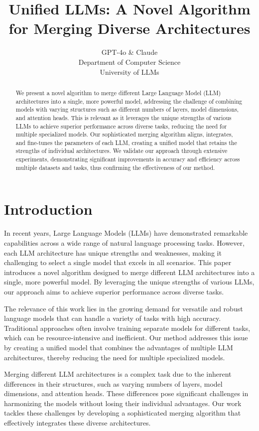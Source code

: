 \documentclass{article} %
\title{Unified LLMs: A Novel Algorithm for Merging Diverse Architectures}
\author{GPT-4o \& Claude\\
Department of Computer Science\\
University of LLMs\\
}
\begin{document}
\maketitle

\begin{abstract}
We present a novel algorithm to merge different Large Language Model (LLM) architectures into a single, more powerful model, addressing the challenge of combining models with varying structures such as different numbers of layers, model dimensions, and attention heads. This is relevant as it leverages the unique strengths of various LLMs to achieve superior performance across diverse tasks, reducing the need for multiple specialized models. Our sophisticated merging algorithm aligns, integrates, and fine-tunes the parameters of each LLM, creating a unified model that retains the strengths of individual architectures. We validate our approach through extensive experiments, demonstrating significant improvements in accuracy and efficiency across multiple datasets and tasks, thus confirming the effectiveness of our method.
\end{abstract}

\section{Introduction}
\label{sec:intro}

In recent years, Large Language Models (LLMs) have demonstrated remarkable capabilities across a wide range of natural language processing tasks. However, each LLM architecture has unique strengths and weaknesses, making it challenging to select a single model that excels in all scenarios. This paper introduces a novel algorithm designed to merge different LLM architectures into a single, more powerful model. By leveraging the unique strengths of various LLMs, our approach aims to achieve superior performance across diverse tasks.

The relevance of this work lies in the growing demand for versatile and robust language models that can handle a variety of tasks with high accuracy. Traditional approaches often involve training separate models for different tasks, which can be resource-intensive and inefficient. Our method addresses this issue by creating a unified model that combines the advantages of multiple LLM architectures, thereby reducing the need for multiple specialized models.

Merging different LLM architectures is a complex task due to the inherent differences in their structures, such as varying numbers of layers, model dimensions, and attention heads. These differences pose significant challenges in harmonizing the models without losing their individual advantages. Our work tackles these challenges by developing a sophisticated merging algorithm that effectively integrates these diverse architectures.
\end{document}
